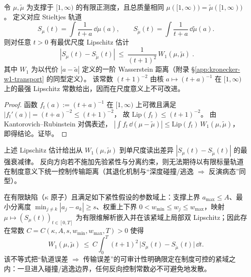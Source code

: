 \begin{proposition}\label{prop:xi-stieltjes-w1-lipschitz}
令 \(\mu,\tilde\mu\) 为支撑于 \([1,\infty)\) 的有限正测度，且总质量相同
\(\mu([1,\infty))=\tilde\mu([1,\infty))\)。
定义对应 Stieltjes 轨道
\[
S_\mu(t)=\int\frac{1}{t+a}\,\dd\mu(a),
\qquad
S_{\tilde\mu}(t)=\int\frac{1}{t+a}\,\dd\tilde\mu(a).
\]
则对任意 \(t>0\) 有最优尺度 Lipschitz 估计
\[
\boxed{\;
|S_\mu(t)-S_{\tilde\mu}(t)|
\ \le\ \frac{1}{(t+1)^2}\,W_1(\mu,\tilde\mu)\; }.
\]
其中 \(W_1\) 为以代价 \(|a-\tilde a|\) 定义的一阶 Wasserstein 距离（附录 \S\ref{app:kronecker-w1-transport} 的同型定义）。
该常数 \((t+1)^{-2}\) 由核 \(a\mapsto (t+a)^{-1}\) 在 \([1,\infty)\) 上的最强 Lipschitz 常数给出，因而在尺度意义上不可改进。
\end{proposition}
\begin{proof}
函数 \(f_t(a):=(t+a)^{-1}\) 在 \([1,\infty)\) 上可微且满足
\(
|f_t'(a)|=(t+a)^{-2}\le (t+1)^{-2}
\)，
故 \(\mathrm{Lip}(f_t)\le (t+1)^{-2}\)。
由 Kantorovich--Rubinstein 对偶表述，
\(
|\int f_t\,\dd(\mu-\tilde\mu)|\le \mathrm{Lip}(f_t)\,W_1(\mu,\tilde\mu)
\)，
即得结论。证毕。
\end{proof}

\begin{remark}\label{rem:xi-stieltjes-w1-local-inverse}
上述 Lipschitz 估计给出从 \(W_1(\mu,\tilde\mu)\) 到单尺度读出差异 \(|S_\mu(t)-S_{\tilde\mu}(t)|\) 的最强衰减律。
反向方向若不施加先验紧性与分离约束，则无法期待以有限标量轨道在制度意义下统一控制传输距离（其退化机制与“深度碰撞/逃逸 \(\Rightarrow\) 反演病态”同型）。
\par
在有限缺陷（\(\kappa\) 原子）且满足如下紧性假设的参数域上：支撑上界 \(a_{\max}\le A\)、最小分离度 \(\min_{j\ne k}|a_j-a_k|\ge s\)、权重上下界 \(0<w_{\min}\le w_j\le w_{\max}\)，映射
\(
\mu\mapsto (S_\mu(t))_{t\in[0,T]}
\)
为有限维解析嵌入并在该紧域上局部双 Lipschitz；因此存在常数 \(C=C(\kappa,A,s,w_{\min},w_{\max},T)>0\) 使得
\[
W_1(\mu,\tilde\mu)\ \le\ C\int_{0}^{T}(t+1)^2\,\bigl|S_\mu(t)-S_{\tilde\mu}(t)\bigr|\,\dd t.
\]
该不等式把“轨道误差 \(\Rightarrow\) 传输误差”的可审计性明确限定在制度可控的紧域之内：一旦进入碰撞/逃逸边界，任何反向控制常数必不可避免地发散。
\end{remark}

